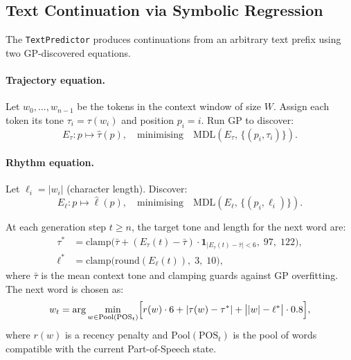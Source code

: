 \documentclass[11pt,a4paper]{article}
\begin{document}
\subsection{Text Continuation via Symbolic Regression}
\label{sec:predict}

The \texttt{TextPredictor} produces continuations from an arbitrary text prefix using two GP-discovered equations.

\paragraph{Trajectory equation.}
Let $w_0, \ldots, w_{n-1}$ be the tokens in the context window of size $W$. Assign each token its tone $\tau_i = \tau(w_i)$ and position $p_i = i$. Run GP to discover:
\begin{equation}
  E_\tau\!: p \mapsto \hat{\tau}(p),
  \quad\text{minimising}\quad\text{MDL}(E_\tau,\,\{(p_i,\tau_i)\}).
  \label{eq:traj}
\end{equation}

\paragraph{Rhythm equation.}
Let $\ell_i = |w_i|$ (character length). Discover:
\begin{equation}
  E_\ell\!: p \mapsto \hat{\ell}(p),
  \quad\text{minimising}\quad\text{MDL}(E_\ell,\,\{(p_i,\ell_i)\}).
  \label{eq:rhythm}
\end{equation}

At each generation step $t \geq n$, the target tone and length for the next word are:
\begin{align}
  \tau^* &= \text{clamp}\!\bigl(\bar{\tau} + (E_\tau(t) - \bar{\tau})\cdot\mathbf{1}_{|E_\tau(t)-\bar{\tau}|<6},\;97,\;122\bigr), \label{eq:target_tone}\\[4pt]
  \ell^* &= \text{clamp}\!\bigl(\text{round}(E_\ell(t)),\;3,\;10\bigr), \label{eq:target_len}
\end{align}
where $\bar{\tau}$ is the mean context tone and clamping guards against GP overfitting. The next word is chosen as:
\begin{equation}
  w_t = \arg\min_{w \in \text{Pool}(\text{POS}_t)} \Bigl[
    r(w)\cdot 6 + |\tau(w) - \tau^*| + \bigl||w|-\ell^*\bigr|\cdot 0.8
  \Bigr],
  \label{eq:word_score}
\end{equation}
where $r(w)$ is a recency penalty and $\text{Pool}(\text{POS}_t)$ is the pool of words compatible with the current Part-of-Speech state.
\end{document}
